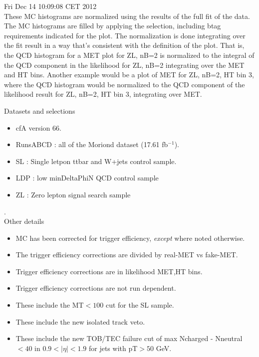 \documentclass[11pt]{article}
\begin{document}
  Fri Dec 14 10:09:08 CET 2012 \\


  These MC histograms are normalized using the results of the full fit of the data.
  The MC histograms are filled by applying the selection, including btag requirements
  indicated for the plot.
  The normalization is done integrating over the fit result in a way that's consistent
  with the definition of the plot.
  That is, the QCD histogram for a MET plot for ZL, nB=2 is normalized to the
  integral of the QCD component in the likelihood for ZL, nB=2 integrating
  over the MET and HT bins.
  Another example would be a plot of MET for ZL, nB=2, HT bin 3, where the
  QCD histogram would be normalized to the QCD component of the likelihood
  result for ZL, nB=2, HT bin 3, integrating over MET.

  \vspace{1cm}

   Datasets and selections
   \begin{itemize}
     \item cfA version 66.
     \item RunsABCD : all of the Moriond dataset (17.61 fb$^{-1}$).
     \item SL : Single letpon ttbar and W+jets control sample.
     \item LDP : low minDeltaPhiN QCD control sample
     \item ZL : Zero lepton signal search sample
   \end{itemize}

.\\

   Other details
   \begin{itemize}
     \item MC has been corrected for trigger efficiency, {\it except} where noted otherwise.
     \item  The trigger efficiency corrections are divided by real-MET vs fake-MET.
     \item Trigger efficiency corrections are in likelihood MET,HT bins.
     \item Trigger efficiency corrections are not run dependent.
     \item These include the MT$<100$ cut for the SL sample.
     \item These include the new isolated track veto.
     \item These include the new TOB/TEC failure cut of max Ncharged - Nneutral $<40$ in $0.9<|\eta|<1.9$ for
             jets with pT$>50$ GeV.
   \end{itemize}
\end{document}
